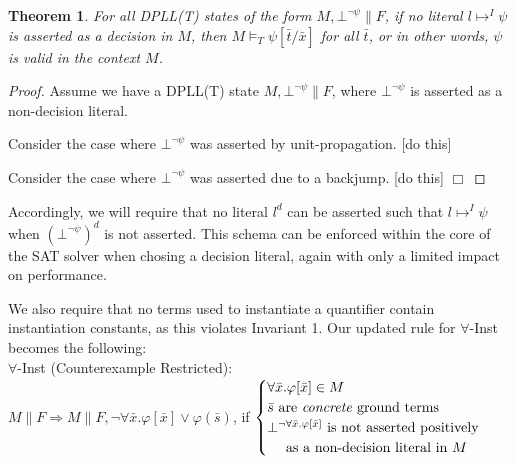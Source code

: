 \documentclass{llncs}
\newtheorem{thm}{Theorem}
\begin{document}
\begin{thm}
For all DPLL(T) states of the form $M, \bot^{\neg \psi} \parallel F$, if no literal $l \mapsto^I \psi$ is asserted as a decision in $M$, then $M \models_T \psi[\bar{t}/\bar{x}]$ for all $\bar{t}$, or in other words, $\psi$ is valid in the context $M$.
\end{thm}
\begin{proof}
Assume we have a DPLL(T) state $M, \bot^{\neg \psi} \parallel F$, where $\bot^{\neg \psi}$ is asserted as a non-decision literal.

Consider the case where $\bot^{\neg \psi}$ was asserted by unit-propagation.
[do this]

Consider the case where $\bot^{\neg \psi}$ was asserted due to a backjump.
[do this] $\Box$
\end{proof}

Accordingly, we will require that no literal $l^d$ can be asserted such that $l \mapsto^I \psi$ when $(\bot^{\neg \psi})^d$ is not asserted.
This schema can be enforced within the core of the SAT solver when chosing a decision literal, again with only a limited impact on performance.

We also require that no terms used to instantiate a quantifier contain instantiation constants, as this violates Invariant 1.
Our updated rule for $\forall$-Inst becomes the following: \\

\noindent $\forall$-Inst (Counterexample Restricted): \\

$M \parallel F \Longrightarrow M \parallel F, \neg \forall \bar{x}. \varphi[ \bar{ x } ] \vee \varphi( \bar{ s } )$, if   
$\begin{cases}
  \forall \bar{x}. \varphi[ \bar{ x } ] \in M \\
  \bar{ s } \text{ are \emph{concrete} ground terms} \\
  \bot^{\neg \forall \bar{x}. \varphi[ \bar{ x } ]} \text{ is not asserted positively }\\
  \text{ \ \ \ as a non-decision literal in $M$ } \\    
\end{cases}$ \\
\end{document}
